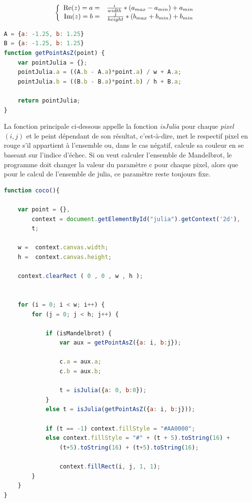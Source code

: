 \documentclass{article}
\theoremstyle{definition}
\begin{document}
\[
\left\{
   \begin{array}{r c l}
      \operatorname{Re}(z) = a = & \frac{i}{width}*(a_{max} - a_{min}) +
      a_{min} \\
      \operatorname{Im}(z) = b = & \frac{j}{height}*(b_{max} + b_{min}) +
      b_{min} \\
   \end{array}
\right.
\]

\newpage

\begin{lstlisting}[language=JavaScript]
A = {a: -1.25, b: 1.25}
B = {a: -1.25, b: 1.25}
function getPointAsZ(point) {
	var pointJulia = {};
	pointJulia.a = ((A.b - A.a)*point.a) / w + A.a;
	pointJulia.b = ((B.b - B.a)*point.b) / h + B.a;
	
	return pointJulia; 
}
\end{lstlisting}

La fonction principale ci-dessous appelle la fonction \textit{isJulia} pour
chaque \textit {pixel} \((i,j)\) et le peint dépendant de son résultat,
c'est-à-dire, met le respectif pixel en rouge s'il appartient à l'ensemble
ou, dans le cas négatif, calcule sa couleur en se baseant sur l'indice d'échec.
Si on veut calculer l'ensemble de Mandelbrot, le programme doit changer
la valeur du paramètre c pour chaque pixel, alors que pour le calcul de
l'ensemble de julia, ce paramètre reste toujours fixe.

\vspace{12pt}

\begin{lstlisting}[language=JavaScript]
function coco(){

	var	point = {},
		context = document.getElementById("julia").getContext('2d'),
		t;
		
	w =  context.canvas.width;
	h =  context.canvas.height;
			
	context.clearRect ( 0 , 0 , w , h );			

	
	for (i = 0; i < w; i++) { 
		for (j = 0; j < h; j++) {
		
			if (isMandelbrot) {
				var aux = getPointAsZ({a: i, b:j});
				
				c.a = aux.a;
				c.b = aux.b;
				
				t = isJulia({a: 0, b:0});
			}
			else t = isJulia(getPointAsZ({a: i, b:j}));
			
			if (t == -1) context.fillStyle = "#AA0000";
			else context.fillStyle = "#" + (t + 5).toString(16) +
				(t+5).toString(16) + (t+5).toString(16);
			
        		context.fillRect(i, j, 1, 1);	
		}	
	}
}
\end{lstlisting}
\newpage
\end{document}
